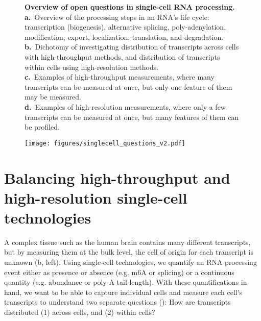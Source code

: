 \clearpage
\thispagestyle{facingcaption}
\begin{figure}[h]
\captionsetup{labelformat=prev-page}
\caption[Overview of open questions in single-cell RNA processing.]{\textbf{Overview of open questions in single-cell RNA processing.}\\
\textbf{a.}~Overview of the processing steps in an RNA's life cycle: transcription (biogenesis), alternative splicing, poly-adenylation, modification, export, localization, translation, and degradation.\\
\textbf{b.}~Dichotomy of investigating distribution of transcripts across cells with high-throughput methods, and distribution of transcripts within cells using high-resolution methods.\\
\textbf{c.}~Examples of high-throughput measurements, where many transcripts can be measured at once, but only one feature of them may be measured.\\
\textbf{d.}~Examples of high-resolution measurements, where only a few transcripts can be measured at once, but many features of them can be profiled.
}
\label{fig:singlecell_questions}
\end{figure}
\clearpage
\begin{figure}[h]
\ContinuedFloat
\captionsetup{labelformat=empty}
\centering
\texttt{[image: figures/singlecell\_questions\_v2.pdf]}
\end{figure}
\addtocounter{figure}{1}
\clearpage


\section{Balancing high-throughput and high-resolution single-cell technologies}

A complex tissue such as the human brain contains many different transcripts, but by measuring them at the bulk level, the cell of origin for each transcript is unknown (b, left). Using single-cell technologies, we quantify an RNA processing event either as presence or absence (e.g. m6A or splicing) or a continuous quantity (e.g. abundance or poly-A tail length). With these quantifications in hand, we want to be able to capture individual cells and measure each cell's transcripts to understand two separate questions (): How are transcripts distributed (1) across cells, and (2) within cells?

